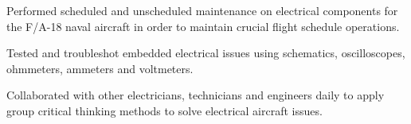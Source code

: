 \documentclass[letterpaper]{deedy-resume} %
\begin{document}
\begin{minipage}[t]{0.66\textwidth}
\sectionspace %




\vspace{\topsep} %
\begin{tightitemize}
\item Performed scheduled and unscheduled maintenance on electrical components for the F/A-18 naval aircraft in order to maintain crucial flight schedule operations.
\item Tested and troubleshot embedded electrical issues using schematics, oscilloscopes, ohmmeters, ammeters and voltmeters.
\item Collaborated with other electricians, technicians and engineers daily to apply group critical thinking methods to solve electrical aircraft issues.
\end{tightitemize}

\sectionspace %

\end{minipage} %








\end{document}
